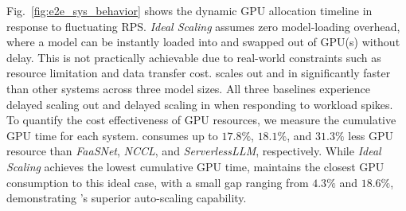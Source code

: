 {{ 
Fig.~\ref{fig:e2e_sys_behavior} shows the dynamic GPU allocation timeline in response to fluctuating RPS. 
\textit{Ideal Scaling} assumes zero model-loading overhead, where a model can be instantly loaded into and swapped out of GPU(s) without delay. This is not practically achievable due to real-world constraints such as resource limitation and data transfer cost. 
\SysName scales out and in significantly faster than other systems across three model sizes. 
All three baselines experience delayed scaling out and delayed scaling in when responding to workload spikes. 
To quantify the cost effectiveness of GPU resources, we measure the cumulative GPU time for each system. \SysName consumes up to $17.8\%$, $18.1\%$, and $31.3\%$ less GPU resource than \textit{FaaSNet}, \textit{NCCL}, and \textit{ServerlessLLM}, respectively. 
While \textit{Ideal Scaling} achieves the lowest cumulative GPU time, \SysName maintains the closest GPU consumption to this ideal case, with a small gap ranging from $4.3\%$ and $18.6\%$, demonstrating \SysName's superior auto-scaling capability. 


}}
